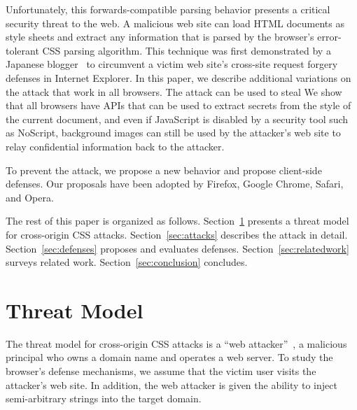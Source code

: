 \documentclass{acm_proc_article-sp}
\begin{document}
Unfortunately, this forwards-compatible parsing behavior presents a critical
security threat to the web. A malicious web site can load HTML documents as
style sheets and extract any information that is parsed by the browser's
error-tolerant CSS parsing algorithm. This technique was first demonstrated by
a Japanese blogger~\cite{cssxss} to circumvent a victim web site's cross-site
request forgery defenses in Internet Explorer. In this paper, we describe
additional variations on the attack that work in all browsers. The attack can be used to steal We show that all browsers have APIs that can be used to extract secrets from the style of the current document, and even if JavaScript is disabled by a security tool such as NoScript, background images can still be used by the attacker's web site to relay confidential information back to the attacker.

To prevent the attack, we propose a new behavior and propose
client-side defenses. Our proposals have been adopted by Firefox, Google
Chrome, Safari, and Opera.

The rest of this paper is organized as follows. Section~\ref{sec:threatmodel} presents a threat model for cross-origin CSS attacks.
Section~\ref{sec:attacks} describes the attack in detail. Section~\ref{sec:defenses} proposes and evaluates defenses.
Section~\ref{sec:relatedwork} surveys related work.
Section~\ref{sec:conclusion} concludes.

% 

% 

\section{Threat Model} \label{sec:threatmodel}

The threat model for cross-origin CSS attacks is a ``web
attacker''~\cite{jackson09thesis}, a malicious principal who owns a domain
name and operates a web server. To study the browser's defense mechanisms, we
assume that the victim user visits the attacker's web site. In addition, the
web attacker is given the ability to inject semi-arbitrary strings into the
target domain.
% 
\end{document}
